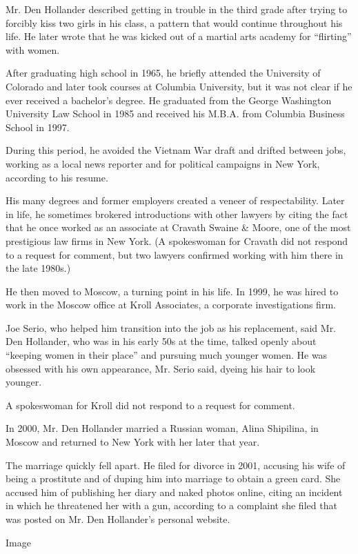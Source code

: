 Mr. Den Hollander described getting in trouble in the third grade after
trying to forcibly kiss two girls in his class, a pattern that would
continue throughout his life. He later wrote that he was kicked out of a
martial arts academy for ``flirting'' with women.

After graduating high school in 1965, he briefly attended the University
of Colorado and later took courses at Columbia University, but it was
not clear if he ever received a bachelor's degree. He graduated from the
George Washington University Law School in 1985 and received his M.B.A.
from Columbia Business School in 1997.

During this period, he avoided the Vietnam War draft and drifted between
jobs, working as a local news reporter and for political campaigns in
New York, according to his resume.

His many degrees and former employers created a veneer of
respectability. Later in life, he sometimes brokered introductions with
other lawyers by citing the fact that he once worked as an associate at
Cravath Swaine \& Moore, one of the most prestigious law firms in New
York. (A spokeswoman for Cravath did not respond to a request for
comment, but two lawyers confirmed working with him there in the late
1980s.)

He then moved to Moscow, a turning point in his life. In 1999, he was
hired to work in the Moscow office at Kroll Associates, a corporate
investigations firm.

Joe Serio, who helped him transition into the job as his replacement,
said Mr. Den Hollander, who was in his early 50s at the time, talked
openly about ``keeping women in their place'' and pursuing much younger
women. He was obsessed with his own appearance, Mr. Serio said, dyeing
his hair to look younger.

A spokeswoman for Kroll did not respond to a request for comment.

In 2000, Mr. Den Hollander married a Russian woman, Alina Shipilina, in
Moscow and returned to New York with her later that year.

The marriage quickly fell apart. He filed for divorce in 2001, accusing
his wife of being a prostitute and of duping him into marriage to obtain
a green card. She accused him of publishing her diary and naked photos
online, citing an incident in which he threatened her with a gun,
according to a complaint she filed that was posted on Mr. Den
Hollander's personal website.

Image


